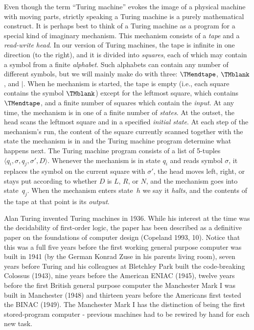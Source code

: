 \documentclass[../../include/open-logic-section]{subfiles}
\begin{document}

\begin{explain}
Even though the term ``Turing machine'' evokes the image of a physical
machine with moving parts, strictly speaking a Turing machine is a
purely mathematical construct.  It is perhaps best to think of a
Turing machine as a program for a special kind of imaginary mechanism.
This mechanism consists of a \emph{tape} and a \emph{read-write head}.
In our version of Turing machines, the tape is infinite in one
direction (to the right), and it is divided into \emph{squares}, each
of which may contain a symbol from a finite \emph{alphabet}.  Such
alphabets can contain any number of different symbols, but we will
mainly make do with three: $\TMendtape$, $\TMblank$, and
$\mid$.  When he mechanism is started, the tape is empty (i.e., each
square contains the symbol $\TMblank$) except for the
leftmost square, which contains $\TMendtape$, and a finite number
of squares which contain the \emph{input}.  At any time, the mechanism
is in one of a finite number of \emph{states}.  At the outset, the
head scans the leftmost square and in a specified \emph{initial
  state}.  At each step of the mechanism's run, the content of the
square currently scanned together with the state the mechanism is in
and the Turing machine program determine what happens next.  The Turing
machine program consists of a list of 5-tuples $\langle q_i, \sigma,
q_j, \sigma', D\rangle$.  Whenever the mechanism is in state $q_i$ and
reads symbol $\sigma$, it replaces the symbol on the current square
with $\sigma'$, the head moves left, right, or stays put according to
whether $D$ is $L$, $R$, or $N$, and the mechanism goes into
state~$q_j$.  When the mechanism enters state~$h$ we say it
\emph{halts}, and the contents of the tape at that point is its
\emph{output}.

Alan Turing invented Turing machines in 1936. While his interest at the time was the decidability of first-order logic, the paper has been described as a definitive paper on the foundations of computer design (Copeland 1993, 10). Notice that this was a full five years before the first working general purpose computer was built in 1941 (by the German Konrad Zuse in his parents living room), seven years before Turing and his colleagues at Bletchley Park built the code-breaking Colossus (1943), nine years before the American ENIAC (1945), twelve years before the first British general purpose computer the Manchester Mark I was built in Manchester (1948) and thirteen years before the Americans first tested the BINAC (1949). The Manchester Mark I has the distinction of being the first stored-program computer - previous machines had to be rewired by hand for each new task.
\end{explain}
\end{document}
